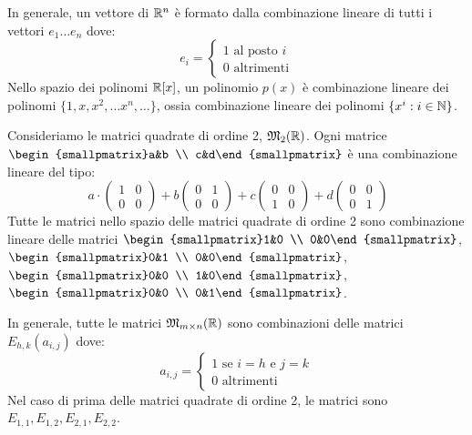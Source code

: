 In generale, un vettore di $\mathbb{R}^n$ \`e formato dalla combinazione lineare di tutti i vettori $e_1 \dots e_n$ dove:
\[
e_i =
\begin{cases}
1 \text{ al posto } i \\
0 \text{ altrimenti}
\end{cases}
\]
Nello spazio dei polinomi $\mathbb{R}[x]$, un polinomio $p(x)$ \`e combinazione lineare dei polinomi $\{ 1, x, x^2, \dots x^n, \dots \}$, ossia combinazione lineare dei polinomi $\{ x^i : i \in \mathbb{N} \}$.

Consideriamo le matrici quadrate di ordine 2, $\mathfrak{M}_2 (\mathbb{R})$. Ogni matrice $\begin{smallpmatrix}a&b \\ c&d\end{smallpmatrix}$ \`e una combinazione lineare del tipo:
\[\
a \cdot
\begin{pmatrix}
1 & 0 \\
0 & 0 
\end{pmatrix}
+ b 
\begin{pmatrix}
0 & 1 \\
0 & 0 
\end{pmatrix}
+ c 
\begin{pmatrix}
0 & 0 \\
1 & 0 
\end{pmatrix}
+ d 
\begin{pmatrix}
0 & 0 \\
0 & 1
\end{pmatrix}
\]
Tutte le matrici nello spazio delle matrici quadrate di ordine 2 sono combinazione lineare delle matrici $\begin{smallpmatrix}1&0 \\ 0&0\end{smallpmatrix}$, $\begin{smallpmatrix}0&1 \\ 0&0\end{smallpmatrix}$, $\begin{smallpmatrix}0&0 \\ 1&0\end{smallpmatrix}$, $\begin{smallpmatrix}0&0 \\ 0&1\end{smallpmatrix}$.

In generale, tutte le matrici $\mathfrak{M}_{m \times n} (\mathbb{R})$ sono combinazioni delle matrici $E_{h,k} (a_{i,j})$ dove:
\[
a_{i,j} = 
\begin{cases}
1 \text{ se } i = h \text{ e } j = k \\
0 \text{ altrimenti}
\end{cases}
\]
Nel caso di prima delle matrici quadrate di ordine 2, le matrici sono $E_{1,1}, E_{1,2}, E_{2,1}, E_{2,2}$.

